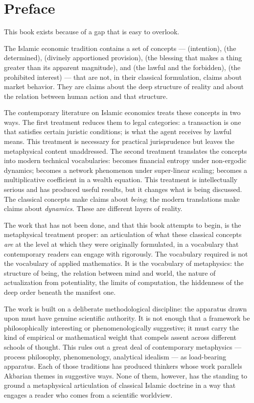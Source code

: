 \chapter*{Preface}

This book exists because of a gap that is easy to overlook.

The Islamic economic tradition contains a set of concepts ---
 (intention),  (the determined), 
(divinely apportioned provision),  (the blessing that makes a
thing greater than its apparent magnitude),  and 
(the lawful and the forbidden),  (the prohibited interest) ---
that are not, in their classical formulation, claims about market
behavior. They are claims about the deep structure of reality and about
the relation between human action and that structure.

The contemporary literature on Islamic economics treats these concepts
in two ways. The first treatment reduces them to legal categories: a
 transaction is one that satisfies certain juristic
conditions;  is what the agent receives by lawful means.
This treatment is necessary for practical jurisprudence but leaves the
metaphysical content unaddressed. The second treatment translates the
concepts into modern technical vocabularies:  becomes financial
entropy under non-ergodic dynamics;  becomes a network
phenomenon under super-linear scaling;  becomes a
multiplicative coefficient in a wealth equation. This treatment is
intellectually serious and has produced useful results, but it changes
what is being discussed. The classical concepts make claims about
\textit{being}; the modern translations make claims about
\textit{dynamics}. These are different layers of reality.

The work that has not been done, and that this book attempts to begin,
is the metaphysical treatment proper: an articulation of what these
classical concepts \textit{are} at the level at which they were
originally formulated, in a vocabulary that contemporary readers can
engage with rigorously. The vocabulary required is not the vocabulary of
applied mathematics. It is the vocabulary of metaphysics: the structure
of being, the relation between mind and world, the nature of
actualization from potentiality, the limits of computation, the
hiddenness of the deep order beneath the manifest one.

The work is built on a deliberate methodological discipline: the
apparatus drawn upon must have genuine scientific authority. It is not
enough that a framework be philosophically interesting or
phenomenologically suggestive; it must carry the kind of empirical or
mathematical weight that compels assent across different schools of
thought. This rules out a great deal of contemporary metaphysics ---
process philosophy, phenomenology, analytical idealism --- as
load-bearing apparatus. Each of those traditions has produced thinkers
whose work parallels Akbarian themes in suggestive ways. None of them,
however, has the standing to ground a metaphysical articulation of
classical Islamic doctrine in a way that engages a reader who comes from
a scientific worldview.

